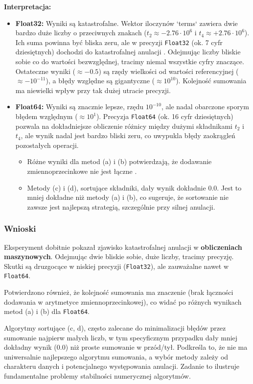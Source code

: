 \documentclass[11pt, a4paper]{article}
\begin{document}
\noindent \textbf{Interpretacja:}
\begin{itemize}
    \item \textbf{Float32:} Wyniki są katastrofalne. Wektor iloczynów `terms` zawiera dwie bardzo duże liczby o przeciwnych znakach ($t_2 \approx -2.76 \cdot 10^6$ i $t_4 \approx +2.76 \cdot 10^6$). Ich suma powinna być bliska zeru, ale w precyzji \texttt{Float32} (ok. 7 cyfr dziesiętnych) dochodzi do  katastrofalnej anulacji . Odejmując liczby bliskie sobie co do wartości bezwzględnej, tracimy niemal wszystkie cyfry znaczące. Ostateczne wyniki ($\approx -0.5$) są rzędy wielkości od wartości referencyjnej ($ \approx -10^{-11}$), a błędy względne są gigantyczne ($ \approx 10^{10}$). Kolejność sumowania ma niewielki wpływ przy tak dużej utracie precyzji.
    
    \item \textbf{Float64:} Wyniki są znacznie lepsze, rzędu $10^{-10}$, ale nadal obarczone sporym błędem względnym ($ \approx 10^1$). Precyzja \texttt{Float64} (ok. 16 cyfr dziesiętnych) pozwala na dokładniejsze obliczenie różnicy między dużymi składnikami $t_2$ i $t_4$, ale wynik nadal jest bardzo bliski zeru, co uwypukla błędy zaokrągleń pozostałych operacji.
    \begin{itemize}
        \item Różne wyniki dla metod (a) i (b) potwierdzają, że dodawanie zmiennoprzecinkowe  nie jest łączne .
        \item Metody (c) i (d), sortujące składniki, dały wynik dokładnie 0.0. Jest to mniej dokładne niż metody (a) i (b), co sugeruje, że sortowanie nie zawsze jest najlepszą strategią, szczególnie przy silnej anulacji.
    \end{itemize}
\end{itemize}

\subsubsection{Wnioski}
Eksperyment dobitnie pokazał zjawisko  katastrofalnej anulacji  w \textbf{obliczeniach maszynowych}. Odejmując dwie bliskie sobie, duże liczby, tracimy precyzję. Skutki są druzgocące w niskiej precyzji (\texttt{Float32}), ale zauważalne nawet w \texttt{Float64}.

Potwierdzono również, że kolejność sumowania ma znaczenie (brak łączności dodawania w arytmetyce zmiennoprzecinkowej), co widać po różnych wynikach metod (a) i (b) dla \texttt{Float64}.

Algorytmy sortujące (c, d), często zalecane do minimalizacji błędów przez sumowanie najpierw małych liczb, w tym specyficznym przypadku dały mniej dokładny wynik (0.0) niż proste sumowanie w przód/tył. Podkreśla to, że nie ma uniwersalnie najlepszego algorytmu sumowania, a wybór metody zależy od charakteru danych i potencjalnego występowania anulacji. Zadanie to ilustruje fundamentalne problemy  stabilności numerycznej  algorytmów.
\end{document}
